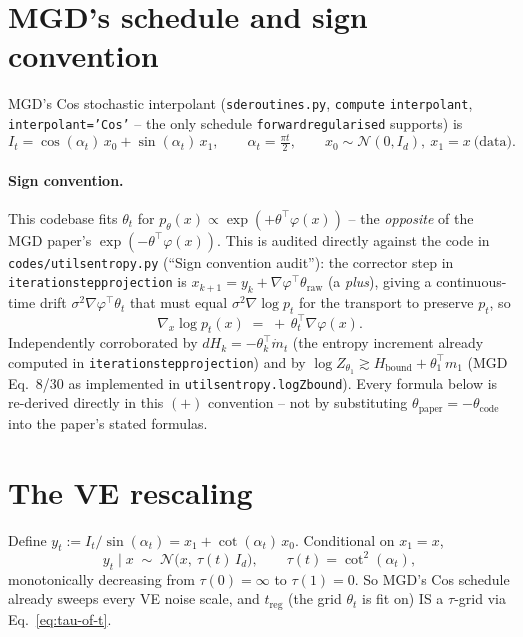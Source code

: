 \documentclass[11pt]{article}
\newcommand{\code}[1]{\texttt{#1}}
\renewcommand{\_}{\origunderscore\allowbreak}
\begin{document}
\section{MGD's schedule and sign convention}

MGD's Cos stochastic interpolant (\code{sde\_routines.py}, \code{compute\_}
\code{interpolant}, \code{interpolant='Cos'} -- the only schedule
\code{forward\_regularised} supports) is
\begin{equation}
  I_t = \cos(\alpha_t)\,x_0 + \sin(\alpha_t)\,x_1, \qquad \alpha_t = \tfrac{\pi t}{2},
  \qquad x_0\sim\mathcal N(0,I_d),\ x_1 = x\ \text{(data)}.
\end{equation}

\paragraph{Sign convention.} This codebase fits $\theta_t$ for
$p_\theta(x)\propto\exp(+\theta^\top\varphi(x))$ -- the \emph{opposite} of
the MGD paper's $\exp(-\theta^\top\varphi(x))$. This is audited directly
against the code in \code{codes/utils\_entropy.py} (``Sign convention
audit''): the corrector step in \code{iteration\_step\_projection} is
$x_{k+1} = y_k + \nabla\varphi^\top\theta_{\mathrm{raw}}$ (a \emph{plus}),
giving a continuous-time drift $\sigma^2\nabla\varphi^\top\theta_t$ that
must equal $\sigma^2\nabla\log p_t$ for the transport to preserve $p_t$, so
\begin{equation}
  \nabla_x \log p_t(x) \;=\; +\,\theta_t^\top \nabla\varphi(x).
  \label{eq:score-sign}
\end{equation}
Independently corroborated by $dH_k = -\theta_k^\top \dot m_t$ (the entropy
increment already computed in \code{iteration\_step\_projection}) and by
$\log Z_{\theta_1} \gtrsim H_{\mathrm{bound}} + \theta_1^\top m_1$ (MGD
Eq.~8/30 as implemented in \code{utils\_entropy.log\_Z\_bound}). Every
formula below is re-derived directly in this $(+)$ convention -- not by
substituting $\theta_{\mathrm{paper}} = -\theta_{\mathrm{code}}$ into the
paper's stated formulas.

\section{The VE rescaling}

Define $y_t := I_t/\sin(\alpha_t) = x_1 + \cot(\alpha_t)\,x_0$. Conditional
on $x_1 = x$,
\begin{equation}
  y_t \mid x \;\sim\; \mathcal N\!\big(x,\ \tau(t)\,I_d\big), \qquad
  \tau(t) = \cot^2(\alpha_t),
  \label{eq:tau-of-t}
\end{equation}
monotonically decreasing from $\tau(0)=\infty$ to $\tau(1)=0$. So MGD's Cos
schedule already sweeps every VE noise scale, and $t_{\mathrm{reg}}$ (the
grid $\theta_t$ is fit on) IS a $\tau$-grid via Eq.~\ref{eq:tau-of-t}.
\end{document}
